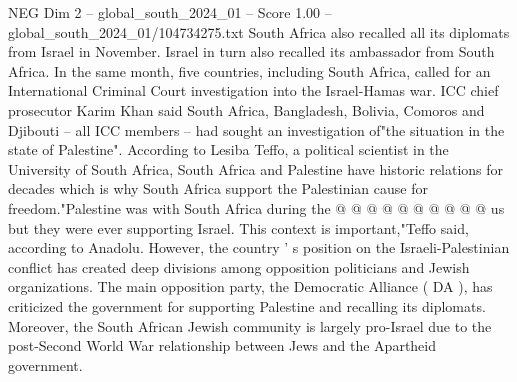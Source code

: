 \begin{textsample}{NEG Dim 2 – global\_south\_2024\_01 – Score 1.00 – global\_south\_2024\_01/104734275.txt}
South Africa also recalled all its diplomats from Israel in November.
Israel in turn also recalled its ambassador from South Africa.
In the same month, five countries, including South Africa, called for an International Criminal Court investigation into the Israel-Hamas war.
ICC chief prosecutor Karim Khan said South Africa, Bangladesh, Bolivia, Comoros and Djibouti -- all ICC members -- had sought an investigation of"the situation in the state of Palestine".
According to Lesiba Teffo, a political scientist in the University of South Africa, South Africa and Palestine have historic relations for decades which is why South Africa support the Palestinian cause for freedom."Palestine was with South Africa during the @ @ @ @ @ @ @ @ @ @ us but they were ever supporting Israel.
This context is important,"Teffo said, according to Anadolu.
However, the country ' s position on the Israeli-Palestinian conflict has created deep divisions among opposition politicians and Jewish organizations.
The main opposition party, the Democratic Alliance ( DA ), has criticized the government for supporting Palestine and recalling its diplomats.
Moreover, the South African Jewish community is largely pro-Israel due to the post-Second World War relationship between Jews and the Apartheid government.

\end{textsample}
